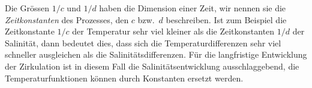 Die Grössen $1/c$ und $1/d$ haben die Dimension einer Zeit, wir nennen
sie die {\em Zeitkonstanten} des Prozesses, den $c$ bzw.~$d$ beschreiben.
Ist zum Beispiel die Zeitkonstante $1/c$ der Temperatur sehr viel kleiner
als die Zeitkonstanten $1/d$ der Salinität, dann bedeutet dies, dass
sich die Temperaturdifferenzen sehr viel schneller ausgleichen als die
Salinitätsdifferenzen.
Für die langfristige Entwicklung der Zirkulation ist in diesem Fall
die Salinitätsentwicklung ausschlaggebend, die Temperaturfunktionen
können durch Konstanten ersetzt werden.




